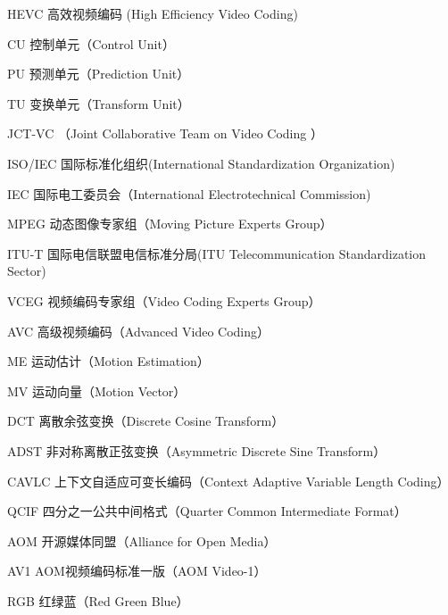 \begin{denotation}[3cm]
\item[HEVC] 高效视频编码 (High Efficiency Video Coding)
\item[CU] 控制单元（Control Unit）
\item[PU] 预测单元（Prediction Unit）
\item[TU] 变换单元（Transform Unit）
\item[JCT-VC] （Joint Collaborative Team on Video Coding ）
\item[ISO/IEC] 国际标准化组织(International Standardization Organization)
\item[IEC] 国际电工委员会（International Electrotechnical Commission)
\item[MPEG] 动态图像专家组（Moving Picture Experts Group）
\item[ITU-T] 国际电信联盟电信标准分局(ITU Telecommunication Standardization Sector)
\item[VCEG] 视频编码专家组（Video Coding Experts Group）
\item[AVC] 高级视频编码（Advanced Video Coding）
\item[ME] 运动估计（Motion Estimation）
\item[MV] 运动向量（Motion Vector）
\item[DCT] 离散余弦变换（Discrete Cosine Transform）
\item[ADST] 非对称离散正弦变换（Asymmetric Discrete Sine Transform）
\item[CAVLC] 上下文自适应可变长编码（Context Adaptive Variable Length Coding）
\item[QCIF] 四分之一公共中间格式（Quarter Common Intermediate Format）
\item[AOM] 开源媒体同盟（Alliance for Open Media）
\item[AV1] AOM视频编码标准一版（AOM Video-1）
\item[RGB] 红绿蓝（Red Green Blue）
\end{denotation}
